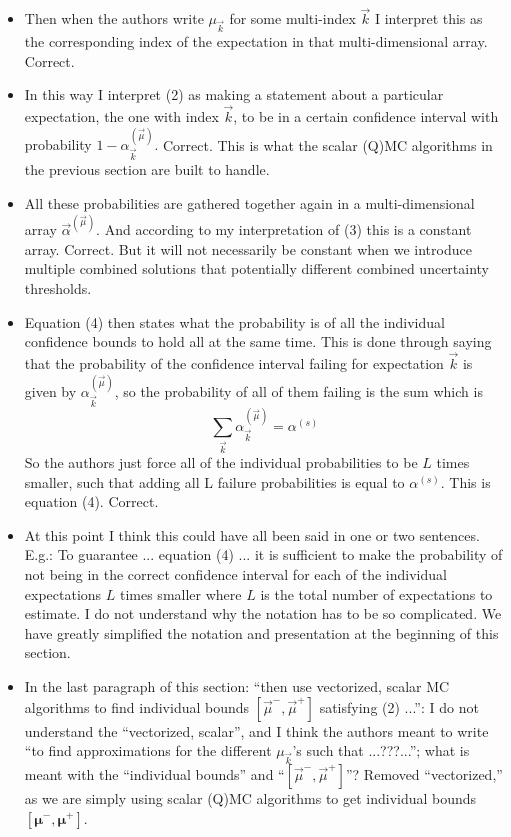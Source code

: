 \documentclass{article}[12pt]
\newcommand{\Referee}[1]{{\color{blue} #1 \newline}}
\begin{document}
\begin{itemize}
    \item \Referee{Then when the authors write $\mu_{\vec{k}}$ for some multi-index $\vec{k}$ I interpret this as the corresponding index of the expectation in that multi-dimensional array.}Correct. 
    \item \Referee{In this way I interpret (2) as making a statement about a particular expectation, the one with index $\vec{k}$, to be in a certain confidence interval with probability $1 - \alpha_{\vec{k}}^{(\vec{\mu})}$.}Correct. This is what the scalar (Q)MC algorithms in the previous section are built to handle. 
    \item \Referee{All these probabilities are gathered together again in a multi-dimensional array $\vec{\alpha}^{(\vec{\mu})}$. And according to my interpretation of (3) this is a constant array.}Correct. But it will not necessarily be constant when we introduce multiple combined solutions that potentially different combined uncertainty thresholds.
    \item \Referee{Equation (4) then states what the probability is of all the individual confidence bounds to hold all at the same time. This is done through saying that the probability of the confidence interval failing for expectation $\vec{k}$ is given by $\alpha_{\vec{k}}^{(\vec{\mu})}$, so the probability of all of them failing is the sum which is
    $$\sum_{\vec{k}} \alpha_{\vec{k}}^{(\vec{\mu})} = \alpha^{(s)}$$
    So the authors just force all of the individual probabilities to be $L$ times smaller, such that adding all L failure probabilities is equal to $\alpha^{(s)}$. This is equation (4).}Correct. 
    \item \Referee{At this point I think this could have all been said in one or two sentences. E.g.: To guarantee ... equation (4) ... it is sufficient to make the probability of not being in the correct confidence interval for each of the individual expectations $L$ times smaller where $L$ is the total number of expectations to estimate. I do not understand why the notation has to be so complicated.}We have greatly simplified the notation and presentation at the beginning of this section. 
    \item \Referee{In the last paragraph of this section: ``then use vectorized, scalar MC algorithms to find individual bounds $[\vec{\mu}^-, \vec{\mu}^+]$ satisfying (2) ...'': I do not understand the ``vectorized, scalar'', and I think the authors meant to write ``to find approximations for the different $\mu_{\vec{k}}$'s such that ...???...''; what is meant with the ``individual bounds'' and ``$[\vec{\mu}^-, \vec{\mu}^+]$''?}Removed ``vectorized,'' as we are simply using scalar (Q)MC algorithms to get individual bounds $[\boldsymbol{\mu}^-,\boldsymbol{\mu}^+]$. 

\end{itemize}
\end{document}
